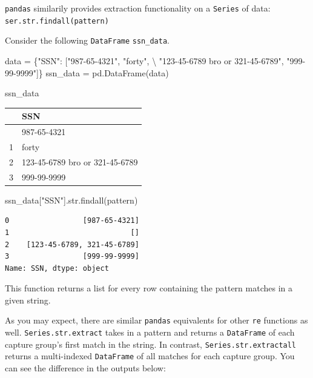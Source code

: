 \documentclass[
  letterpaper,
  DIV=11,
  numbers=noendperiod]{scrreprt}
\newenvironment{Shaded}{\begin{snugshade}}{\end{snugshade}}
\newcommand{\BuiltInTok}[1]{\textcolor[rgb]{0.00,0.23,0.31}{#1}}
\newcommand{\NormalTok}[1]{\textcolor[rgb]{0.00,0.23,0.31}{#1}}
\newcommand{\OperatorTok}[1]{\textcolor[rgb]{0.37,0.37,0.37}{#1}}
\newcommand{\StringTok}[1]{\textcolor[rgb]{0.13,0.47,0.30}{#1}}
\begin{document}
\texttt{pandas} similarily provides extraction functionality on a
\texttt{Series} of data: \texttt{ser.str.findall(pattern)}

Consider the following \texttt{DataFrame} \texttt{ssn\_data}.

\begin{Shaded}
\begin{Highlighting}[]
\NormalTok{data }\OperatorTok{=}\NormalTok{ \{}\StringTok{"SSN"}\NormalTok{: [}\StringTok{"987{-}65{-}4321"}\NormalTok{, }\StringTok{"forty"}\NormalTok{, }\OperatorTok{\textbackslash{}}
                \StringTok{"123{-}45{-}6789 bro or 321{-}45{-}6789"}\NormalTok{,}
               \StringTok{"999{-}99{-}9999"}\NormalTok{]\}}
\NormalTok{ssn\_data }\OperatorTok{=}\NormalTok{ pd.DataFrame(data)}
\end{Highlighting}
\end{Shaded}

\begin{Shaded}
\begin{Highlighting}[]
\NormalTok{ssn\_data}
\end{Highlighting}
\end{Shaded}

\begin{longtable}[]{@{}ll@{}}
\toprule\noalign{}
& SSN \\
\midrule\noalign{}
\endhead
\bottomrule\noalign{}
\endlastfoot
0 & 987-65-4321 \\
1 & forty \\
2 & 123-45-6789 bro or 321-45-6789 \\
3 & 999-99-9999 \\
\end{longtable}

\begin{Shaded}
\begin{Highlighting}[]
\NormalTok{ssn\_data[}\StringTok{"SSN"}\NormalTok{].}\BuiltInTok{str}\NormalTok{.findall(pattern)}
\end{Highlighting}
\end{Shaded}

\begin{verbatim}
0                 [987-65-4321]
1                            []
2    [123-45-6789, 321-45-6789]
3                 [999-99-9999]
Name: SSN, dtype: object
\end{verbatim}

This function returns a list for every row containing the pattern
matches in a given string.

As you may expect, there are similar \texttt{pandas} equivalents for
other \texttt{re} functions as well. \texttt{Series.str.extract} takes
in a pattern and returns a \texttt{DataFrame} of each capture group's
first match in the string. In contrast, \texttt{Series.str.extractall}
returns a multi-indexed \texttt{DataFrame} of all matches for each
capture group. You can see the difference in the outputs below:
\end{document}
